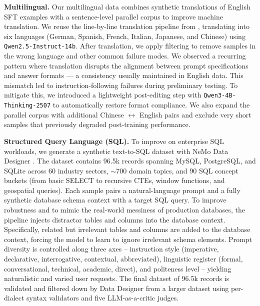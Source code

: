\textbf{Multilingual.}
Our multilingual data combines synthetic translations of English SFT examples with a sentence-level parallel corpus to improve machine translation. We reuse the line-by-line translation pipeline from \nanomodel, translating into six languages (German, Spanish, French, Italian, Japanese, and Chinese) using \texttt{Qwen2.5-Instruct-14b}. After translation, we apply filtering to remove samples in the wrong language and other common failure modes. We observed a recurring pattern where translation disrupts the alignment between prompt specifications and answer formats — a consistency usually maintained in English data. This mismatch led to instruction-following failures during preliminary testing. To mitigate this, we introduced a lightweight post-editing step with \texttt{Qwen3-4B-Thinking-2507} to automatically restore format compliance. We also expand the parallel corpus with additional Chinese $\leftrightarrow$ English pairs and exclude very short samples that previously degraded post-training performance.


\textbf{Structured Query Language (SQL).}
To improve \ourmodel on enterprise SQL workloads, we generate a synthetic text-to-SQL dataset with NeMo Data Designer \citep{nemo-data-designer}. The dataset contains 96.5k records spanning MySQL, PostgreSQL, and SQLite across 60 industry sectors, $\sim$700 domain topics, and 90 SQL concept buckets (from basic SELECT to recursive CTEs, window functions, and geospatial queries). Each sample pairs a natural-language prompt and a fully synthetic database schema context with a target SQL query. To improve robustness and to mimic the real-world messiness of production databases, the pipeline injects distractor tables and columns into the database context. Specifically, related but irrelevant tables and columns are added to the database context, forcing the model to learn to ignore irrelevant schema elements. Prompt diversity is controlled along three axes -- instruction style (imperative, declarative, interrogative, contextual, abbreviated), linguistic register (formal, conversational, technical, academic, direct), and politeness level -- yielding naturalistic and varied user requests. The final dataset of 96.5k records is validated and filtered down by Data Designer from a larger dataset using per-dialect syntax validators and five LLM-as-a-critic judges.

